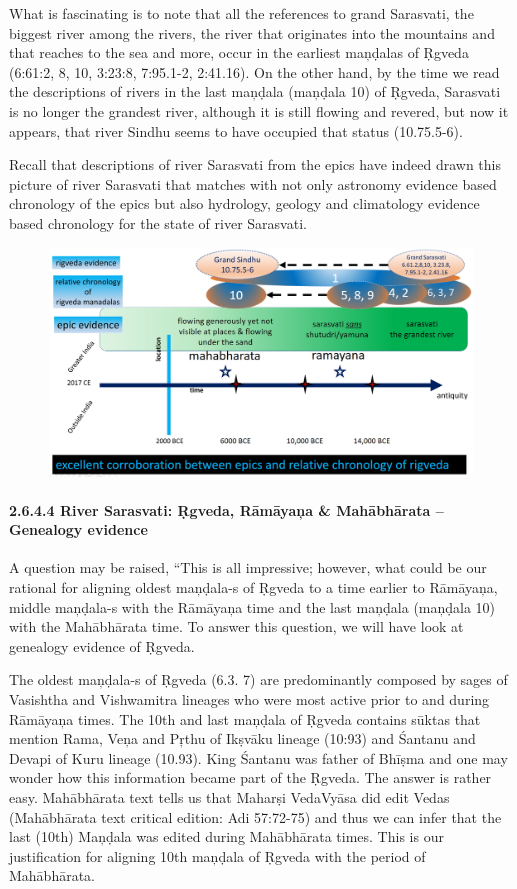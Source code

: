 What is fascinating is to note that all the references to grand Sarasvati, the biggest river among the rivers, the river that originates into the mountains and that reaches to the sea and more, occur in the earliest maņḍalas of Ṛgveda (6:61:2, 8, 10, 3:23:8, 7:95.1-2, 2:41.16). On the other hand, by the time we read the descriptions of rivers in the last maņḍala (maņḍala 10) of Ṛgveda, Sarasvati is no longer the grandest river, although it is still flowing and revered, but now it appears, that river Sindhu seems to have occupied that status (10.75.5-6).

\newpage

Recall that descriptions of river Sarasvati from the epics have indeed drawn this picture of river Sarasvati that matches with not only astronomy evidence based chronology of the epics but also hydrology, geology and climatology evidence based chronology for the state of river Sarasvati.

\begin{figure}[!htbp]
\includegraphics[scale=0.21]{"images/8-23.jpg"}
\caption{}\label{art8-fig23}
\end{figure}


\paragraph*{2.6.4.4 River Sarasvati: Ṛgveda, Rāmāyaņa \& Mahābhārata – Genealogy evidence}

A question may be raised, “This is all impressive; however, what could be our rational for aligning oldest maņḍala-s of Ṛgveda to a time earlier to Rāmāyaņa, middle maņḍala-s with the Rāmāyaņa time and the last maņḍala (maņḍala 10) with the Mahābhārata time. To answer this question, we will have look at genealogy evidence of Ṛgveda.

The oldest maņḍala-s of Ṛgveda (6.3. 7) are predominantly composed by sages of Vasishtha and Vishwamitra lineages who were most active prior to and during Rāmāyaņa times. The 10th and last maņḍala of Ṛgveda contains sūktas that mention Rama, Veņa and Pŗthu of Ikṣvāku lineage (10:93) and Śantanu and Devapi of Kuru lineage (10.93). King Śantanu was father of Bhīṣma and one may wonder how this information became part of the Ṛgveda. The answer is rather easy. Mahābhārata text tells us that Maharṣi VedaVyāsa did edit Vedas (Mahābhārata text critical edition: Adi 57:72-75) and thus we can infer that the last (10th) Maņḍala was edited during Mahābhārata times. This is our justification for aligning 10th maņḍala of Ṛgveda with the period of Mahābhārata.

